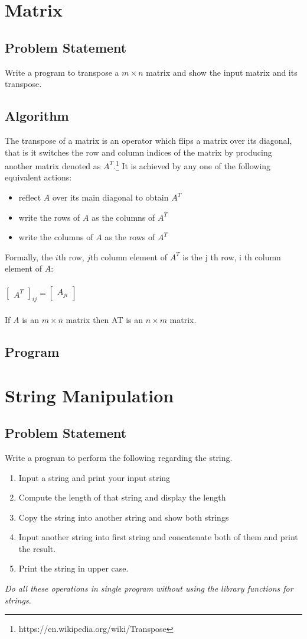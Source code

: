\documentclass[11pt]{report}
\begin{document}
\chapter{Matrix}
\section{Problem Statement}
Write a program to transpose a $m \times n$ matrix and show the input matrix and its transpose.
\section{Algorithm}
The transpose of a matrix is an operator which flips a matrix over its diagonal, that is it switches the row and column indices of the matrix by producing another matrix denoted as $A^T$.\footnote{https://en.wikipedia.org/wiki/Transpose} It is achieved by any one of the following equivalent actions:
\begin{itemize}
\item reflect $A$ over its main diagonal to obtain $A^T$
\item write the rows of $A$ as the columns of $A^T$
\item write the columns of $A$ as the rows of $A^T$
\end{itemize}
Formally, the $i$th row, $j$th column element of $A^T$ is the j th row, i th column element of $A$: \\\\
$
\begin{bmatrix}
A^T
\end{bmatrix}_{ij}
=
\begin{bmatrix}
A_{ji}
\end{bmatrix}
$\\\\
If $A$ is an $m \times n$ matrix then AT is an $n \times m$ matrix.
\section{Program}



\chapter{String Manipulation}
\section{Problem Statement}
Write a program to perform the following regarding the string.
\begin{enumerate}
  \item Input a string and print your input string
  \item Compute the length of that string and display the length
  \item Copy the string into another string and show both strings
  \item Input another string into first string and concatenate both of them and print the result.
  \item Print the string in upper case.
\end{enumerate}
\emph{Do all these operations in single program without using the library functions for strings.}
\end{document}

